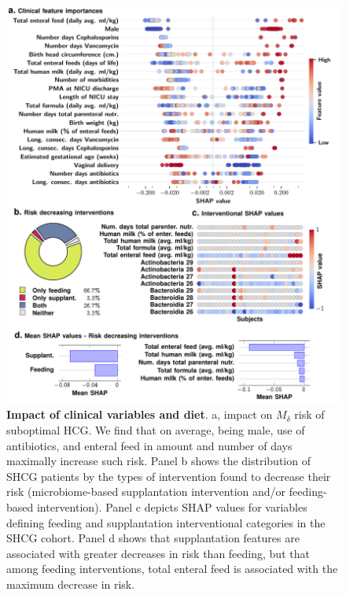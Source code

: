\documentclass[onecolumn,10pt]{IEEEtran}
\newcommand{\captionN}[1]{\caption{\color{darkgray} \sffamily \fontsize{9}{10}\selectfont #1  }}
\def\erisk{$M_\delta$\xspace}
\begin{document}
\begin{figure}[!ht]
\centering   
\includegraphics[width=.99\textwidth]{fig5.pdf}

\captionN{\textbf{Impact of clinical variables and diet}.  a,  impact  on \erisk risk of suboptimal HCG. We find that on average, being male, use of antibiotics, and enteral feed in amount and number of days maximally increase such risk. Panel b shows the distribution of SHCG patients by the types of intervention found to decrease their risk (microbiome-based supplantation intervention and/or feeding-based intervention).  Panel c depicts SHAP values for variables defining feeding and supplantation interventional categories in the SHCG cohort. Panel d shows that supplantation features are associated with greater decreases in risk than feeding, but that among feeding interventions, total enteral feed is associated with the maximum decrease in risk.}\label{fig:clinical}
\end{figure}
\end{document}
